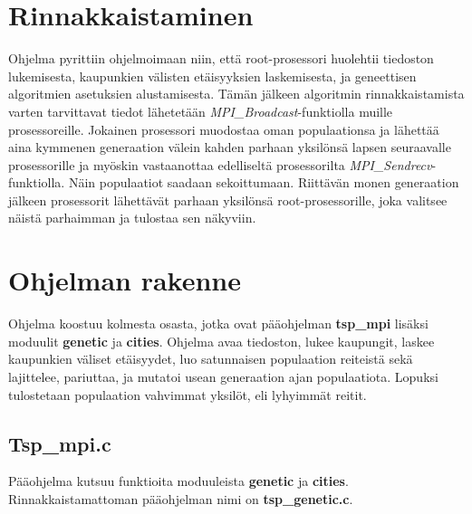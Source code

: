 \documentclass[12pt]{article}
\numberwithin{equation}{section}
\numberwithin{table}{section}
\begin{document}
\section{Rinnakkaistaminen}
Ohjelma pyrittiin ohjelmoimaan niin, että root-prosessori huolehtii tiedoston lukemisesta, kaupunkien välisten etäisyyksien laskemisesta, ja geneettisen algoritmien asetuksien alustamisesta. Tämän jälkeen algoritmin rinnakkaistamista varten tarvittavat tiedot lähetetään \emph{MPI\_Broadcast}-funktiolla muille prosessoreille. Jokainen prosessori muodostaa oman populaationsa ja lähettää aina kymmenen generaation välein kahden parhaan yksilönsä lapsen seuraavalle prosessorille ja myöskin vastaanottaa edelliseltä prosessorilta \emph{MPI\_Sendrecv}-funktiolla. Näin populaatiot saadaan sekoittumaan. Riittävän monen generaation jälkeen prosessorit lähettävät parhaan yksilönsä root-prosessorille, joka valitsee näistä parhaimman ja tulostaa sen näkyviin.



\section{Ohjelman rakenne}

Ohjelma koostuu kolmesta osasta, jotka ovat pääohjelman \textbf{tsp\_mpi} lisäksi moduulit \textbf{genetic} ja \textbf{cities}. Ohjelma avaa tiedoston, lukee kaupungit, laskee kaupunkien väliset etäisyydet, luo satunnaisen populaation reiteistä sekä lajittelee, pariuttaa, ja mutatoi usean generaation ajan populaatiota. Lopuksi tulostetaan populaation vahvimmat yksilöt, eli lyhyimmät reitit.

\subsection{Tsp\_mpi.c}
Pääohjelma kutsuu funktioita moduuleista \textbf{genetic} ja \textbf{cities}. Rinnakkaistamattoman pääohjelman nimi on \textbf{tsp\_genetic.c}.
\end{document}
